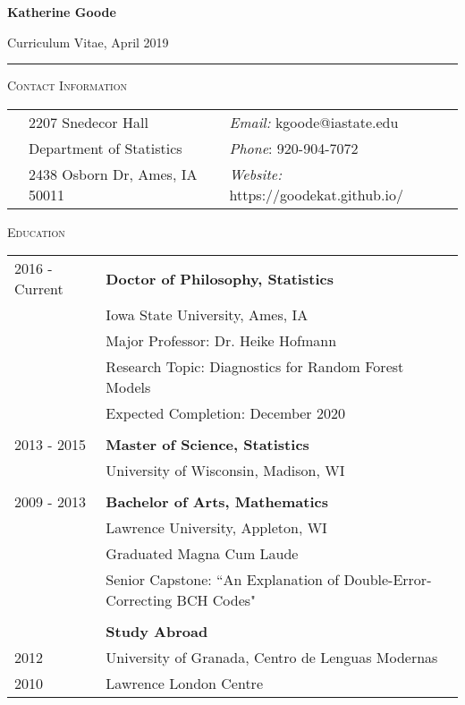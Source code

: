 \documentclass[10pt, oneside]{article}
\begin{document}
\begin{LARGE} \noindent\textbf{Katherine Goode} \end{LARGE} \hfill Curriculum Vitae, April 2019\\
\rule{\textwidth}{1pt}

\vspace{0.25cm}

\noindent \textsc{Contact Information} \hrulefill
\begin{longtable}{p{2.5cm}p{7cm}p{7cm}}
& 2207 Snedecor Hall & \emph{Email:} kgoode@iastate.edu\\
& Department of Statistics & \emph{Phone}: 920-904-7072\\
& 2438 Osborn Dr, Ames, IA 50011 & \emph{Website:} https://goodekat.github.io/
\end{longtable}

\noindent \textsc{Education} \hrulefill
\begin{longtable}{p{2.5cm}p{14cm}}
\hfill{2016 - Current} & \textbf{Doctor of Philosophy, Statistics}\\
& Iowa State University, Ames, IA\\
& Major Professor: Dr. Heike Hofmann\\
& Research Topic: Diagnostics for Random Forest Models\\
& Expected Completion: December 2020\\
\\
\hfill{2013 - 2015} & \textbf{Master of Science, Statistics}\\
& University of Wisconsin, Madison, WI\\
\\
\hfill{2009 - 2013} & \textbf{Bachelor of Arts, Mathematics}\\
& Lawrence University, Appleton, WI\\
& Graduated Magna Cum Laude\\
& Senior Capstone: ``An Explanation of Double-Error-Correcting BCH Codes"\\
\\
& \textbf{Study Abroad}\\
\hfill{2012} & \indent University of Granada, Centro de Lenguas Modernas\\
\hfill{2010} & \indent Lawrence London Centre
\end{longtable}
\end{document}
